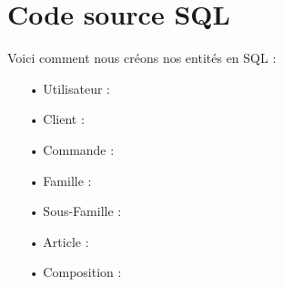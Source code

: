 \section{Code source SQL}

Voici comment nous créons nos entités en SQL :
\begin{enumerate}
\item[•] Utilisateur : \\

\item[•] Client : \\

\item[•] Commande : \\

\item[•] Famille : \\

\item[•] Sous-Famille : \\

\item[•] Article : \\

\item[•] Composition : \\

\end{enumerate}